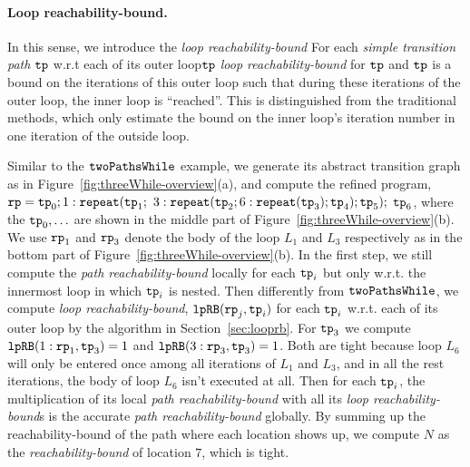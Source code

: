 \paragraph{Loop reachability-bound.}
In this sense, we introduce the \emph{loop reachability-bound}
For each \emph{simple transition path} $\mathtt{tp}$ w.r.t each of its outer loop$\mathtt{tp}$
\emph{loop reachability-bound} for $\mathtt{tp}$ and $\mathtt{tp}$
is a bound on the iterations of
this outer loop
such that during these iterations of the outer loop, the inner loop is ``reached''. 
This is distinguished from the traditional methods, which only estimate the bound on the inner loop's iteration number
in one iteration of the outside loop.


Similar to the $\mathtt{twoPathsWhile}$ example, we generate its abstract transition graph as in Figure~\ref{fig:threeWhile-overview}(a),
and compute the refined program,
$\mathtt{rp} = \mathtt{tp}_0; 1: \mathtt{repeat}(\mathtt{tp}_1;$ 
$3: {\mathtt{repeat}(\mathtt{tp}_2; 6 : {\mathtt{repeat}(\mathtt{tp}_3)}; \mathtt{tp}_4)}; \mathtt{tp}_5);$ 
$\mathtt{tp}_6$,
where the $\mathtt{tp}_0, \ldots$ are shown in the middle part of Figure~\ref{fig:threeWhile-overview}(b).
We use $\mathtt{rp}_1$ and $\mathtt{rp}_3$ denote the body of the loop $L_1$ and $L_3$ respectively as in the bottom part of Figure~\ref{fig:threeWhile-overview}(b).
In the first step, we still compute the \emph{path reachability-bound} locally for each $\mathtt{tp}_i$ but only w.r.t. the innermost loop in which $\mathtt{tp}_i$ is nested.
Then differently from $\mathtt{twoPathsWhile}$,
we compute \emph{loop reachability-bound}, $\mathtt{lpRB}(\mathtt{rp}_j, \mathtt{tp}_i)$ for each $\mathtt{tp}_i$ w.r.t. each of its outer loop by the algorithm in Section~\ref{sec:looprb}.
For $\mathtt{tp}_3$ we compute
$\mathtt{lpRB}(1: \mathtt{rp}_1, \mathtt{tp}_3) = 1$ and
$\mathtt{lpRB}(3: \mathtt{rp}_3, \mathtt{tp}_3) = 1$.
Both are tight because loop $L_6$ will only be entered once among all iterations of $L_1$ and $L_3$, and in all the rest iterations, the body of loop $L_6$ isn't executed at all.
Then for each $\mathtt{tp}_i$, the multiplication of its local \emph{path reachability-bound} with all its \emph{loop reachability-bound}s is the accurate \emph{path reachability-bound} globally.
By summing up the reachability-bound of the path where each location shows up,
we compute $N$ as the \emph{reachability-bound} of location $7$, which is tight.

